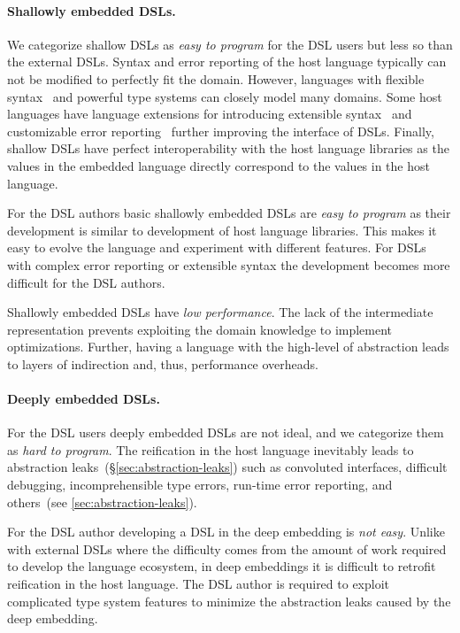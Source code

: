 \paragraph{Shallowly embedded DSLs.} We categorize shallow DSLs as \emph{easy to program} for
 the DSL users but less so than the external DSLs. Syntax and error reporting of the host language
 typically can not be modified to perfectly fit the domain. However, languages with
 flexible syntax~\cite{moors_scala-virtualized_2012,odersky2010contracts} and
 powerful type systems can closely model many domains. Some host languages have
 language extensions for introducing extensible syntax~\cite{SugarJ} and customizable error reporting~\cite{hage2007heuristics,heeren2003scripting} further improving the interface of DSLs. Finally, shallow DSLs have
 perfect interoperability with the host language libraries as the values in the embedded
 language directly correspond to the values in the host language.

For the DSL authors basic shallowly embedded DSLs are \emph{easy to program} as their
 development is similar to development of host language libraries. This makes it easy
 to evolve the language and experiment with different features. For DSLs
 with complex error reporting or extensible syntax the development
 becomes more difficult for the DSL authors.

Shallowly embedded DSLs have \emph{low performance}. The lack of the intermediate representation
prevents exploiting the domain knowledge to implement optimizations. Further, having
a language with the high-level of abstraction leads to layers of indirection and, thus,
performance overheads.

\paragraph{Deeply embedded DSLs.} For the DSL users deeply embedded DSLs are not ideal,
 and we categorize them as \emph{hard to program}. The reification in the host language
 inevitably leads to abstraction leaks~(\S \ref{sec:abstraction-leaks}) such as
 convoluted interfaces, difficult debugging, incomprehensible type errors, run-time error reporting,
 and others~(see \ref{sec:abstraction-leaks}).

For the DSL author developing a DSL in the deep embedding is \emph{not easy}. Unlike with
 external DSLs where the difficulty comes from the amount of work required to develop
 the language ecosystem, in deep embeddings it is difficult to retrofit reification
 in the host language. The DSL author is required to exploit complicated type system features to
 minimize the abstraction leaks caused by the deep embedding.

